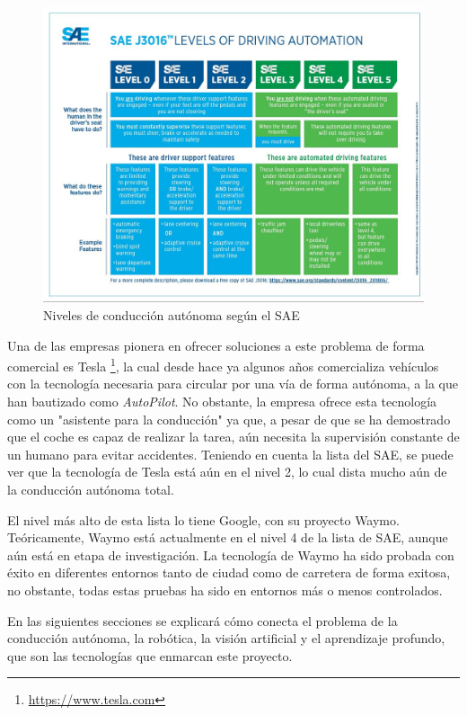 \begin{figure}
  \centering
  \includegraphics[width=.9\linewidth]{img/levels-of-driving}
  \caption{Niveles de conducción autónoma según el SAE}
  \label{fig:levelsdriving}
\end{figure}

Una de las empresas pionera en ofrecer soluciones a este problema de forma comercial es Tesla \footnote{\url{https://www.tesla.com}}, la cual desde hace ya algunos años comercializa vehículos con la tecnología necesaria para circular por una vía de forma autónoma, a la que han bautizado como \textit{AutoPilot}. No obstante, la empresa ofrece esta tecnología como un "asistente para la conducción" ya que, a pesar de que se ha demostrado que el coche es capaz de realizar la tarea, aún necesita la supervisión constante de un humano para evitar accidentes. Teniendo en cuenta la lista del SAE, se puede ver que la tecnología de Tesla está aún en el nivel 2, lo cual dista mucho aún de la conducción autónoma total.

El nivel más alto de esta lista lo tiene Google, con su proyecto Waymo. Teóricamente, Waymo está actualmente en el nivel 4 de la lista de SAE, aunque aún está en etapa de investigación. La tecnología de Waymo ha sido probada con éxito en diferentes entornos tanto de ciudad como de carretera de forma exitosa, no obstante, todas estas pruebas ha sido en entornos más o menos controlados.

En las siguientes secciones se explicará cómo conecta el problema de la conducción autónoma, la robótica, la visión artificial y el aprendizaje profundo, que son las tecnologías que enmarcan este proyecto.

